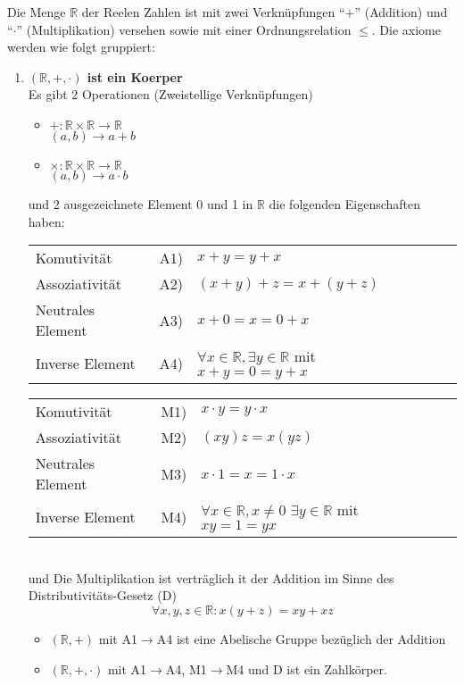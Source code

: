 Die Menge $\mathbb{R}$ der Reelen Zahlen ist mit zwei Verknüpfungen ``$+$'' (Addition) und ``$\cdot$'' (Multiplikation) versehen sowie mit einer Ordnungsrelation $\leq$. Die axiome werden wie folgt gruppiert:
\begin{enumerate}
\item \textbf{$\left( \mathbb{R},+,\cdot\right)$ ist ein Koerper}\\
Es gibt 2 Operationen (Zweistellige Verknüpfungen)
\begin{itemize}
\item $+:\mathbb{R}\times\mathbb{R}\rightarrow\mathbb{R}$\\
$(a,b)\rightarrow a+b$
\item $\times:\mathbb{R}\times\mathbb{R}\rightarrow\mathbb{R}$\\
$(a,b)\rightarrow a\cdot b$
\end{itemize}
und 2 ausgezeichnete Element 0 und 1 in $\mathbb{R}$ die folgenden Eigenschaften haben:\\

\begin{tabular}{l r l r l}
Komutivität & A1) & $x+y=y+x$  \\ 
Assoziativität & A2) & $(x+y)+z=x+(y+z)$  \\
Neutrales Element & A3) & $x+0=x=0+x$ \\
Inverse Element & A4) & $\forall x\in\mathbb{R}, \exists y\in\mathbb{R}$ mit $x+y=0=y+x$
\end{tabular}

\begin{tabular}{l r l r l}
Komutivität  & M1) & $x\cdot y=y\cdot x$ \\ 
Assoziativität  & M2) & $(xy)z=x(yz)$ \\
Neutrales Element  & M3) & $x\cdot 1= x =1\cdot x$\\
Inverse Element  & M4) & $\forall x\in\mathbb{R}, x\not =0$  $ \exists y\in\mathbb{R}$ mit $xy=1=yx$
\end{tabular}
\\

und Die Multiplikation ist verträglich it der Addition im Sinne des Distributivitäts-Gesetz (D)$$\forall x,y,z\in\mathbb{R}:x(y+z)=xy+xz$$

\begin{itemize}
\item $( \mathbb{R},+)$ mit A1$\rightarrow$A4 ist eine Abelische Gruppe bezüglich der Addition
\item  $( \mathbb{R},+,\cdot)$ mit A1$\rightarrow$A4, M1$\rightarrow$M4 und D ist ein Zahlkörper. 
\end{itemize}


\end{enumerate}
